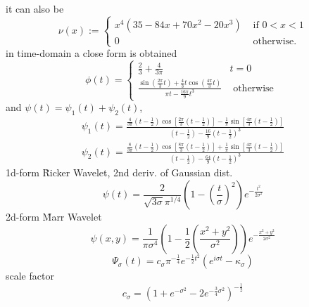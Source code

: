 \documentclass{article}
\begin{document}
    it can also be
    \begin{equation}
        \nu(x):=\left\{\begin{array}{ll}
        x^{4}\left(35-84 x+70 x^{2}-20 x^{3}\right) & \text { if } 0<x<1 \\
        0 & \text { otherwise. }
        \end{array}\right.
    \end{equation}
    in time-domain a close form is obtained
    \begin{equation}
        \phi(t)=\left\{\begin{array}{ll}
        \frac{2}{3}+\frac{4}{3 \pi} & t=0 \\
        \frac{\sin \left(\frac{2 \pi}{3} t\right)+\frac{4}{3} t \cos \left(\frac{4 \pi}{3} t\right)}{\pi t-\frac{16 \pi}{9} t^{3}} & \text { otherwise }
        \end{array}\right.
    \end{equation}
    and $\psi(t)=\psi_{1}(t)+\psi_{2}(t)$,
    \begin{equation}
        \begin{array}{c}
        \psi_{1}(t)=\frac{\frac{4}{3 \pi}\left(t-\frac{1}{2}\right) \cos \left[\frac{2 \pi}{3}\left(t-\frac{1}{2}\right)\right]-\frac{1}{\pi} \sin \left[\frac{4 \pi}{3}\left(t-\frac{1}{2}\right)\right]}{\left(t-\frac{1}{2}\right)-\frac{16}{9}\left(t-\frac{1}{2}\right)^{3}} \\
        \psi_{2}(t)=\frac{\frac{8}{3 \pi}\left(t-\frac{1}{2}\right) \cos \left[\frac{8 \pi}{3}\left(t-\frac{1}{2}\right)\right]+\frac{1}{\pi} \sin \left[\frac{4 \pi}{3}\left(t-\frac{1}{2}\right)\right]}{\left(t-\frac{1}{2}\right)-\frac{64}{9}\left(t-\frac{1}{2}\right)^{3}}
        \end{array}
    \end{equation}
     1d-form \~ Ricker Wavelet, 2nd deriv. of Gaussian dist.
    \begin{equation}
        \psi(t)=\frac{2}{\sqrt{3 \sigma} \pi^{1 / 4}}\left(1-\left(\frac{t}{\sigma}\right)^{2}\right) e^{-\frac{t^{2}}{2 \sigma^{2}}}
    \end{equation}
    2d-form \~ Marr Wavelet
    \begin{equation}
        \psi(x, y)=\frac{1}{\pi \sigma^{4}}\left(1-\frac{1}{2}\left(\frac{x^{2}+y^{2}}{\sigma^{2}}\right)\right) e^{-\frac{x^{2}+y^{2}}{2 \sigma^{2}}}
    \end{equation}
    \begin{equation}
        \Psi_{\sigma}(t)=c_{\sigma} \pi^{-\frac{1}{4}} e^{-\frac{1}{2} t^{2}}\left(e^{i \sigma t}-\kappa_{\sigma}\right)
    \end{equation}
    scale factor
    \begin{equation}
        c_{\sigma}=\left(1+e^{-\sigma^{2}}-2 e^{-\frac{3}{4} \sigma^{2}}\right)^{-\frac{1}{2}}
    \end{equation}
\end{document}
